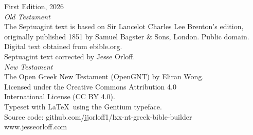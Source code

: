 \thispagestyle{empty}
\vspace*{\fill}
\begin{center}
\begin{small}

First Edition, 2026\\[1.5em]

\textit{Old Testament}\\
The Septuagint text is based on Sir Lancelot Charles Lee Brenton's edition,\\
originally published 1851 by Samuel Bagster \& Sons, London. Public domain.\\
Digital text obtained from ebible.org.\\[1em]

Septuagint text corrected by Jesse Orloff.\\[1.5em]

\textit{New Testament}\\
The Open Greek New Testament (OpenGNT) by Eliran Wong.\\
Licensed under the Creative Commons Attribution 4.0\\
International License (CC BY 4.0).\\[1.5em]

Typeset with \LaTeX\ using the Gentium typeface.\\[1em]

Source code: github.com/jjorloff1/lxx-nt-greek-bible-builder\\
www.jesseorloff.com\\[1em]

\end{small}
\end{center}
